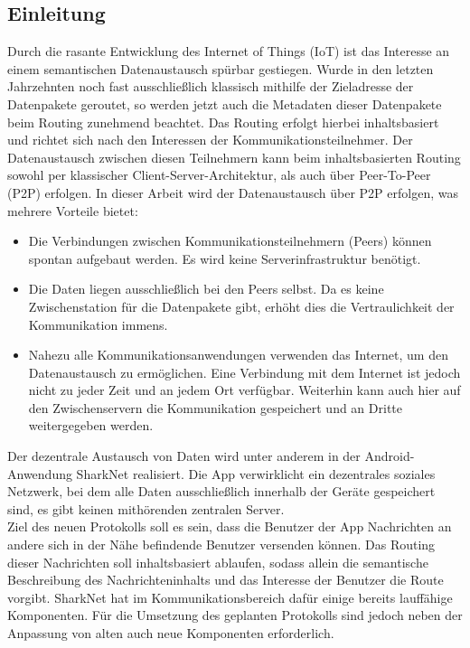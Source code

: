 


\subsection{Einleitung}
Durch die rasante Entwicklung des Internet of Things (IoT) ist das Interesse an einem semantischen Datenaustausch spürbar gestiegen. Wurde in den letzten Jahrzehnten noch fast ausschließlich klassisch mithilfe der Zieladresse der Datenpakete geroutet, so werden jetzt auch die Metadaten dieser Datenpakete beim Routing zunehmend beachtet. Das Routing erfolgt hierbei inhaltsbasiert und richtet sich nach den Interessen der Kommunikationsteilnehmer. Der Datenaustausch zwischen diesen Teilnehmern kann beim inhaltsbasierten Routing sowohl per klassischer Client-Server-Architektur, als auch über Peer-To-Peer (P2P) erfolgen. In dieser Arbeit wird der Datenaustausch über P2P erfolgen, was mehrere Vorteile bietet:
\begin{itemize}
\item Die Verbindungen zwischen Kommunikationsteilnehmern (Peers) können spontan aufgebaut werden. Es wird keine Serverinfrastruktur benötigt.
\item Die Daten liegen ausschließlich bei den Peers selbst. Da es keine Zwischenstation für die Datenpakete gibt, erhöht dies die Vertraulichkeit der Kommunikation immens. 
\item Nahezu alle Kommunikationsanwendungen verwenden das Internet, um den Datenaustausch zu ermöglichen. Eine Verbindung mit dem Internet ist jedoch nicht zu jeder Zeit und an jedem Ort verfügbar. Weiterhin kann auch hier auf den Zwischenservern die Kommunikation gespeichert und an Dritte weitergegeben werden.
\end{itemize}  
Der dezentrale Austausch von Daten wird unter anderem in der Android-Anwendung SharkNet realisiert. Die App verwirklicht ein dezentrales soziales Netzwerk, bei dem alle Daten ausschließlich innerhalb der Geräte gespeichert sind, es gibt keinen mithörenden zentralen Server. \\Ziel des neuen Protokolls soll es sein, dass die Benutzer der App Nachrichten an andere sich in der Nähe befindende Benutzer versenden können. Das Routing dieser Nachrichten soll inhaltsbasiert ablaufen, sodass allein die semantische Beschreibung des Nachrichteninhalts und das Interesse der Benutzer die Route vorgibt. SharkNet hat im Kom\-muni\-ka\-tions\-be\-reich dafür einige bereits lauffähige Komponenten. Für die Umsetzung des geplanten Protokolls sind jedoch neben der Anpassung von alten auch neue Komponenten erforderlich. 
\newpage
